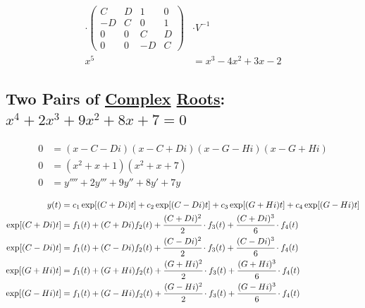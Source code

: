 \documentclass[12pt,a4paper]{article}
\begin{document}
\begin{align}
\cdot \left( \begin{matrix}  C & D & 1 & 0 \\ -D & C & 0 & 1 \\ 0 & 0 & C & D \\ 0 & 0 & -D & C  \end{matrix} \right) &\cdot V^{-1} \\
x^5 &= x^3 - 4 x^2 + 3 x - 2
\end{align}

\subsection{Two Pairs of \href{}{Complex} \href{}{Roots}: $x^4 + 2 x^3 + 9 x^2 + 8 x + 7 = 0$}

\begin{align}
0 &= (x - C - Di)(x - C + Di)(x - G - Hi)(x - G + Hi) \\
0 &= (x^2 + x + 1)(x^2 + x + 7) \\
0 &= y'''' + 2 y''' + 9 y'' + 8 y' + 7 y
\end{align}

\begin{align}
y(t) &= c_1 \exp[(C + Di)t] + c_2 \exp[(C - Di)t] + c_3 \exp[(G + Hi)t] + c_4 \exp[(G - Hi)t] \\
\exp [(C + Di)t] &= f_1(t) + (C + Di) f_2(t) + \cfrac{(C + Di)^2}{2}\cdot f_3(t) + \cfrac{(C + Di)^3}{6}\cdot f_4(t) \\
\exp [(C - Di)t] &= f_1(t) + (C - Di) f_2(t) + \cfrac{(C - Di)^2}{2}\cdot f_3(t) + \cfrac{(C - Di)^3}{6}\cdot f_4(t) \\
\exp [(G + Hi)t] &= f_1(t) + (G + Hi) f_2(t) + \cfrac{(G + Hi)^2}{2}\cdot f_3(t) + \cfrac{(G + Hi)^3}{6}\cdot f_4(t) \\
\exp [(G - Hi)t] &= f_1(t) + (G - Hi) f_2(t) + \cfrac{(G - Hi)^2}{2}\cdot f_3(t) + \cfrac{(G - Hi)^3}{6}\cdot f_4(t)
\end{align}
\end{document}

